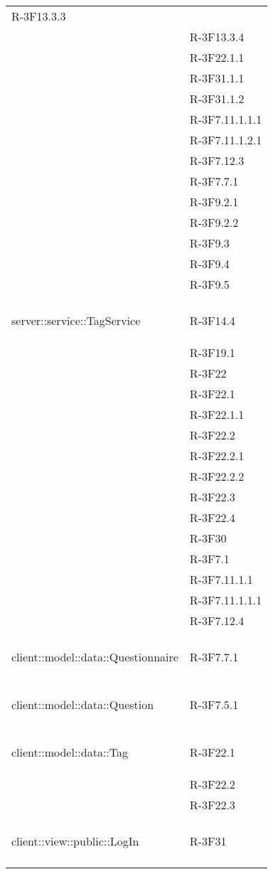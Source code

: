 \begin{longtable}{l p{3cm}}
	R-3F13.3.3 \tabularnewline &
	
	R-3F13.3.4 \tabularnewline &
	
	R-3F22.1.1 \tabularnewline &
	
	R-3F31.1.1 \tabularnewline &
	
	R-3F31.1.2 \tabularnewline &
	
	R-3F7.11.1.1.1 \tabularnewline &
	
	R-3F7.11.1.2.1 \tabularnewline &
	
	R-3F7.12.3 \tabularnewline &
	
	R-3F7.7.1 \tabularnewline &
	
	R-3F9.2.1 \tabularnewline &
	
	R-3F9.2.2 \tabularnewline &
	
	R-3F9.3 \tabularnewline &
	
	R-3F9.4 \tabularnewline &
	
	R-3F9.5 \tabularnewline &\tabularnewline
	\hline
	\hypertarget{server::service::TagService}{server::service::TagService} & R-3F14.4 \tabularnewline &
	
	R-3F19.1 \tabularnewline &
	
	R-3F22 \tabularnewline &
	
	R-3F22.1 \tabularnewline &
	
	R-3F22.1.1 \tabularnewline &
	
	R-3F22.2 \tabularnewline &
	
	R-3F22.2.1 \tabularnewline &
	
	R-3F22.2.2 \tabularnewline &
	
	R-3F22.3 \tabularnewline &
	
	R-3F22.4 \tabularnewline &
	
	R-3F30 \tabularnewline &
	
	R-3F7.1 \tabularnewline &
	
	R-3F7.11.1.1 \tabularnewline &
	
	R-3F7.11.1.1.1 \tabularnewline &
	
	R-3F7.12.4 \tabularnewline &\tabularnewline
	\hline
	\hypertarget{client::model::data::Questionnaire}{client::model::data::Questionnaire} & R-3F7.7.1 \tabularnewline &\tabularnewline
	\hline
	\hypertarget{client::model::data::Question}{client::model::data::Question} & R-3F7.5.1 \tabularnewline &\tabularnewline
	\hline
	\hypertarget{client::model::data::Tag}{client::model::data::Tag} & R-3F22.1 \tabularnewline &
	
	R-3F22.2 \tabularnewline &
	
	R-3F22.3 \tabularnewline &\tabularnewline
	\hline
	\hypertarget{client::view::public::LogIn}{client::view::public::LogIn} & R-3F31 \tabularnewline &
	

\end{longtable}
